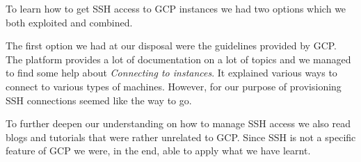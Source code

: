 To learn how to get SSH access to GCP instances we had two options
which we both exploited and combined.

The first option we had at our disposal were the guidelines provided
by GCP. The platform provides a lot of documentation on a lot of
topics and we managed to find some help about \textit{Connecting to
instances}\cite{GCP-connect}. It explained various ways to connect to
various types of machines. However, for our purpose of provisioning
SSH connections seemed like the way to go.

To further deepen our understanding on how to manage SSH access we
also read blogs\cite{ssh-tutorial-2}\cite{ssh-tutorial-3} and
tutorials\cite{ssh-tutorial-1} that were rather unrelated to GCP.
Since SSH is not a specific feature of GCP we were, in the end, able
to apply what we have learnt.
